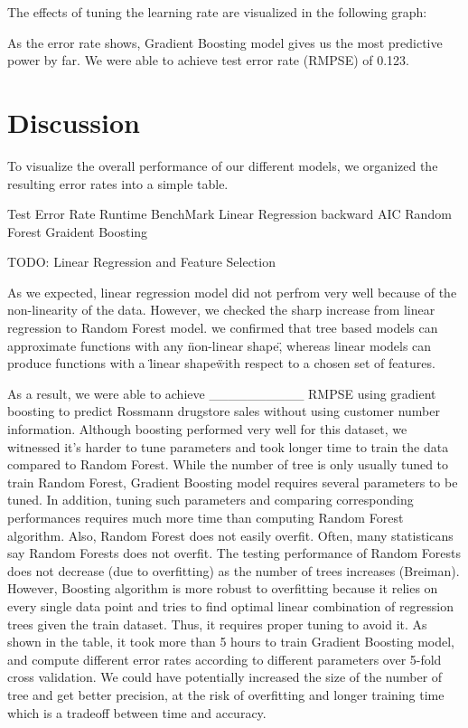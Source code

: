 \documentclass[letterpaper,twocolumn,10pt]{article}
\begin{document}
The effects of tuning the learning rate are visualized in the following graph:


As the error rate shows, Gradient Boosting model gives us the most predictive power by far. We were able to achieve test error rate (RMPSE) of 0.123.



\section{Discussion}
To visualize the overall performance of our different models, we organized the resulting error rates into a simple table. 

                    Test Error Rate    Runtime
BenchMark
Linear Regression
  backward
  AIC
Random Forest
Graident Boosting

TODO: Linear Regression and Feature Selection 


As we expected, linear regression model did not perfrom very well because of the non-linearity of the data. However, we checked the sharp increase from linear regression to Random Forest model. we confirmed that tree based models can approximate functions with any \"non-linear shape\", whereas linear models can produce functions with a \"linear shape\" with respect to a chosen set of features. 

As a result, we were able to achieve __________ RMPSE using gradient boosting to predict Rossmann drugstore sales without using customer number information. Although boosting performed very well for this dataset, we witnessed it's harder to tune parameters and took longer time to train the data compared to Random Forest. While the number of tree is only usually tuned to train Random Forest, Gradient Boosting model requires several parameters to be tuned. In addition, tuning such parameters and comparing corresponding performances requires much more time than computing Random Forest algorithm. Also, Random Forest does not easily overfit. Often, many statisticans say Random Forests does not overfit. The testing performance of Random Forests does not decrease (due to overfitting) as the number of trees increases (Breiman). However, Boosting algorithm is more robust to overfitting because it relies on every single data point and tries to find optimal linear combination of regression trees given the train dataset. Thus, it requires proper tuning to avoid it. As shown in the table, it took more than 5 hours to train Gradient Boosting model, and compute different error rates according to different parameters over 5-fold cross validation. We could have potentially increased the size of the number of tree and get better precision, at the risk of overfitting and longer training time which is a tradeoff between time and accuracy.
\end{document}
